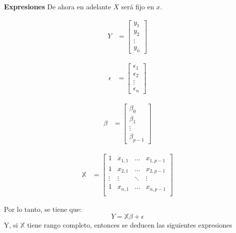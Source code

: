 \textbf{Expresiones}
De ahora en adelante $X$ será fijo en $x$.

\begin{minipage}{\linewidth}
  \centering
  \begin{minipage}{0.10\linewidth}
        \begin{align*}
            Y &= \begin{bmatrix}
            y_{1} \\
            y_{2} \\
            \vdots \\
            y_{n}
            \end{bmatrix}
        \end{align*}
  \end{minipage}
  \hspace{0.05\linewidth}
  \begin{minipage}{0.10\linewidth}
        \begin{align*}
            \epsilon &= \begin{bmatrix}
            \epsilon_{1} \\
            \epsilon_{2} \\
            \vdots \\
            \epsilon_{n}
            \end{bmatrix}
        \end{align*}
  \end{minipage}
  \hspace{0.05\linewidth}
  \begin{minipage}{0.10\linewidth}
        \begin{align*}
            \beta &= \begin{bmatrix}
            \beta_{0} \\
            \beta_{1} \\
            \vdots \\
            \beta_{p-1}
            \end{bmatrix}
        \end{align*}
  \end{minipage}
  \hspace{0.05\linewidth}
  \begin{minipage}{0.40\linewidth}
        \begin{align*}
            \mathbb X &= \begin{bmatrix}
            1 & x_{1,1}  & \dots & x_{1, p-1} \\
            1 & x_{2,1}  & \dots & x_{2, p-1} \\
            \vdots & \vdots & \ddots & \vdots \\
            1 & x_{n,1} & \dots & x_{n, p-1} \\
            \end{bmatrix}
        \end{align*}
  \end{minipage}
\end{minipage}
\vskip0.5cm
Por lo tanto, se tiene que:
$$Y = \mathbb X \beta + \epsilon$$
Y, si $\mathbb X$ tiene rango completo, entonces se deducen las siguientes expresiones

